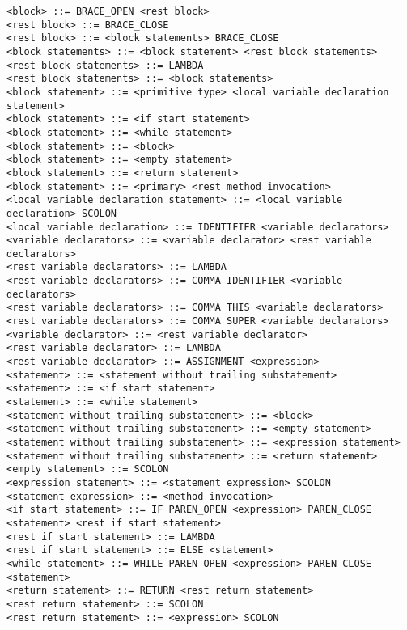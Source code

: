 \documentclass [a4paper,abstracton,titlepage]{scrartcl}
\begin{document}
\begin{lstlisting}
<block> ::= BRACE_OPEN <rest block>
<rest block> ::= BRACE_CLOSE
<rest block> ::= <block statements> BRACE_CLOSE
<block statements> ::= <block statement> <rest block statements>
<rest block statements> ::= LAMBDA
<rest block statements> ::= <block statements>
<block statement> ::= <primitive type> <local variable declaration statement>
<block statement> ::= <if start statement>
<block statement> ::= <while statement>
<block statement> ::= <block>
<block statement> ::= <empty statement>
<block statement> ::= <return statement>
<block statement> ::= <primary> <rest method invocation>
<local variable declaration statement> ::= <local variable declaration> SCOLON
<local variable declaration> ::= IDENTIFIER <variable declarators>
<variable declarators> ::= <variable declarator> <rest variable declarators>
<rest variable declarators> ::= LAMBDA
<rest variable declarators> ::= COMMA IDENTIFIER <variable declarators>
<rest variable declarators> ::= COMMA THIS <variable declarators>
<rest variable declarators> ::= COMMA SUPER <variable declarators>
<variable declarator> ::= <rest variable declarator>
<rest variable declarator> ::= LAMBDA
<rest variable declarator> ::= ASSIGNMENT <expression>
<statement> ::= <statement without trailing substatement>
<statement> ::= <if start statement>
<statement> ::= <while statement>
<statement without trailing substatement> ::= <block>
<statement without trailing substatement> ::= <empty statement>
<statement without trailing substatement> ::= <expression statement>
<statement without trailing substatement> ::= <return statement>
<empty statement> ::= SCOLON
<expression statement> ::= <statement expression> SCOLON
<statement expression> ::= <method invocation>
<if start statement> ::= IF PAREN_OPEN <expression> PAREN_CLOSE <statement> <rest if start statement>
<rest if start statement> ::= LAMBDA
<rest if start statement> ::= ELSE <statement>
<while statement> ::= WHILE PAREN_OPEN <expression> PAREN_CLOSE <statement>
<return statement> ::= RETURN <rest return statement>
<rest return statement> ::= SCOLON
<rest return statement> ::= <expression> SCOLON\end{lstlisting}
\end{document}

